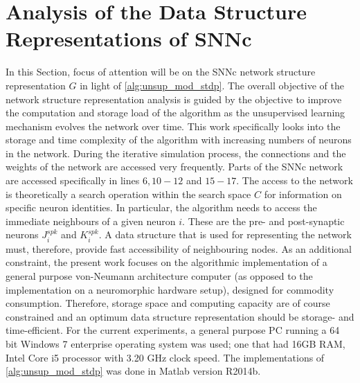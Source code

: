 \section{Analysis of the Data Structure Representations of SNNc} 
In this Section, focus of attention will be on the SNNc network structure representation $G$ in light of \algorithmname \ref{alg:unsup_mod_stdp}. The overall objective of the network structure representation analysis is guided by the objective to improve the computation and storage load of the algorithm as the unsupervised learning mechanism evolves the network over time. This work specifically looks into the storage and time complexity of the algorithm with increasing numbers of neurons in the network. During the iterative simulation process, the connections and the weights of the network are accessed very frequently. Parts of the SNNc network are accessed specifically in lines $6, 10-12$ and $15-17$. The access to the network is theoretically a search operation within the search space $C$ for information on specific neuron identities. In particular, the algorithm needs to access the immediate neighbours of a given neuron $i$. These are the pre- and post-synaptic neurons $J_i^{spk}$ and $K_i^{spk}$. A data structure that is used for representing the network must, therefore, provide fast accessibility of neighbouring nodes. As an additional constraint, the present work focuses on the algorithmic implementation of a general purpose von-Neumann architecture computer (as opposed to the implementation on a neuromorphic hardware \citep{scott2015thesis} setup), designed for  commodity consumption. Therefore, storage space and computing capacity are of course constrained and an optimum data structure representation should be storage- and time-efficient. For the current experiments, a general purpose PC running a 64 bit Windows 7 enterprise operating system was used; one that had 16GB RAM, Intel Core i5 processor with 3.20 GHz clock speed. The implementations of \algorithmname \ref{alg:unsup_mod_stdp} was done in Matlab version R2014b.

